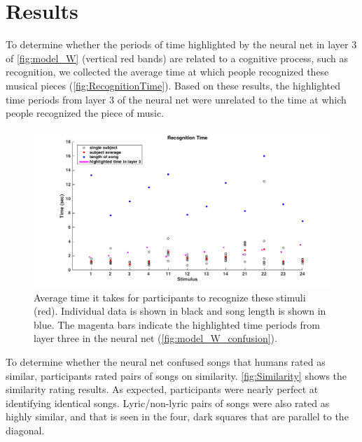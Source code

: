 \section{Results}
To determine whether the periods of time highlighted by the neural net in layer 3 of \autoref{fig:model_W} (vertical red bands) are related to a cognitive process, such as recognition, we collected the average time at which people recognized these musical pieces (\autoref{fig:RecognitionTime}). 
Based on these results, the highlighted time periods from layer 3 of the neural net were unrelated to the time at which people recognized the piece of music. 
\begin{figure}[h] 
  \begin{center}
        \includegraphics[scale=0.5]{Figures/RecognitionTimeGraph.png}
    \caption{Average time it takes for participants to recognize these stimuli (red). Individual data is shown in black and song length is shown in blue. The magenta bars indicate the highlighted time periods from layer three in the neural net (\autoref{fig:model_W_confusion}).}
    \label{fig:RecognitionTime}
  \end{center}
\end{figure}

To determine whether the neural net confused songs that humans rated as similar, participants rated pairs of songs on similarity. 
\autoref{fig:Similarity} shows the similarity rating results. 
As expected, participants were nearly perfect at identifying identical songs. 
Lyric/non-lyric pairs of songs were also rated as highly similar, and that is seen in the four, dark squares that are parallel to the diagonal.

